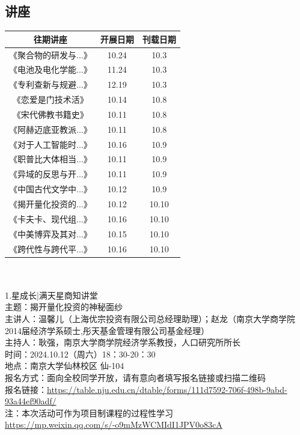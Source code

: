 \documentclass[letterpaper, 12pt]{article}
\begin{document}
\begin{multicols}{2}
\section{讲座}
\begin{tabular}{|c|c|c|}
    \hline
    往期讲座 & 开展日期 & 刊载日期\\
    \hline\hline
    《聚合物的研发与...》 & 10.24 & 10.3\\
    《电池及电化学能...》 & 11.24 & 10.3\\
    《专利查新与规避...》 & 12.19 & 10.3\\
    《恋爱是门技术活》 & 10.14 & 10.8\\
    《宋代佛教书籍史》 & 10.11 & 10.8\\
    《阿赫迈底亚教派...》 & 10.11 & 10.8\\
    《对于人工智能时...》 & 10.16 & 10.9\\
    《职普比大体相当...》 & 10.11 & 10.9\\
    《异域的反思与开...》 & 10.11 & 10.9\\
    《中国古代文学中...》 & 10.12 & 10.9\\
    《揭开量化投资的...》 & 10.12 & 10.10\\
    《卡夫卡、现代组...》 & 10.16 & 10.10\\
    《中美博弈及其对...》 & 10.15 & 10.10\\
    《跨代性与跨代平...》 & 10.16 & 10.10\\
      \hline
\end{tabular}\\\\
1.星成长|满天星商知讲堂\\
主题：揭开量化投资的神秘面纱\\
主讲人：温馨儿（上海优宗投资有限公司总经理助理）；赵龙（南京大学商学院2014届经济学系硕士,彤天基金管理有限公司基金经理）\\
主持人：耿强，南京大学商学院经济学系教授，人口研究所所长\\
时间：2024.10.12（周六）18：30-20：30\\
地点：南京大学仙林校区 仙\uppercase\expandafter{}-104\\
报名方式：面向全校同学开放，请有意向者填写报名链接或扫描二维码\\
报名链接：\url{https://table.nju.edu.cn/dtable/forms/111d7592-706f-498b-9abd-93a44ef90adf/}\\
注：本次活动可作为项目制课程的过程性学习\\
\url{https://mp.weixin.qq.com/s/-o9mMzWCMIdI1JPV0o83cA}\\


\end{multicols}
\end{document}
